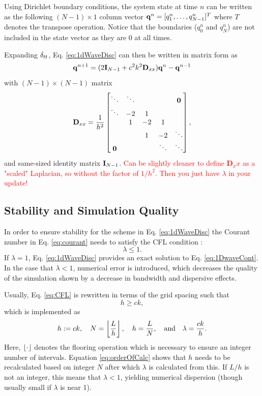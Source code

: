 \documentclass[fleqn]{jaes}
\def\SBcomment[#1]{\textcolor{red}{#1}}
\begin{document}
Using Dirichlet boundary conditions, the system state at time $n$ can be written as the following $(N-1) \times 1$ column vector $\mathbf{q}^n = [q_1^n, \hdots, q_{N-1}^n]^T$ where $T$ denotes the transpose operation. Notice that the boundaries ($q_0^n$ and $q_N^n$) are not included in the state vector as they are 0 at all times.

Expanding $\delta_{tt}$, Eq. \eqref{eq:1dWaveDisc} can then be written in matrix form as
\begin{equation}
    \mathbf{q}^{n+1} = (2 \mathbf{I}_{N-1} + c^2 k^2 \mathbf{D}_{xx})\mathbf{q}^n - \mathbf{q}^{n-1}
\end{equation}
with $(N-1)\times(N-1)$ matrix
\begin{equation}\label{eq:dxxMat}
    \Dxx = \frac{1}{h^2}
    \begin{bmatrix}
        \ddots & \ddots & & &\mathbf{0}\\
        \ddots & -2 & 1 & & \\
        & 1 & -2 & 1 & \\
        & & 1 & -2 & \ddots \\
        \mathbf{0}& & & \ddots & \ddots 
    \end{bmatrix},
\end{equation}
and same-sized identity matrix $\mathbf{I}_{N-1}$. \SBcomment[Can be slightly cleaner to define ${\mathbf D}_{xx}$ as a "scaled" Laplacian, so without the factor of $1/h^2$. Then you just have $\lambda$ in your update!]


\subsection{Stability and Simulation Quality}\label{sec:quality}
In order to ensure stability for the scheme in Eq. \eqref{eq:1dWaveDisc} the Courant number in Eq. \eqref{eq:courant} needs to satisfy the CFL condition \cite{Courant1928}:
\begin{equation}\label{eq:CFL}
    \lambda \leq 1.
\end{equation}
%
If $\lambda = 1$, Eq. \eqref{eq:1dWaveDisc} provides an exact solution to Eq. \eqref{eq:1DwaveCont}. In the case that $\lambda < 1$, numerical error is introduced, which decreases the quality of the simulation shown by a decrease in bandwidth and dispersive effects.

Usually, Eq. \eqref{eq:CFL} is rewritten in terms of the grid spacing such that
\begin{equation}\label{eq:stabilityCond}
    h \geq c k,
\end{equation}
which is implemented as
\begin{equation}\label{eq:orderOfCalc}
    h:=ck, \quad N = \floor[\frac{L}{h}],\quad h = \frac{L}{N},\qaq \lambda = \frac{ck}{h}.
\end{equation}
Here, $\floor[\cdot]$ denotes the flooring operation which is necessary to ensure an integer number of intervals. Equation \eqref{eq:orderOfCalc} shows that $h$ needs to be recalculated based on integer $N$ after which $\lambda$ is calculated from this. If $L/h$ is not an integer, this means that $\lambda < 1$, yielding numerical dispersion (though usually small if $\lambda$ is near 1).
\end{document}
